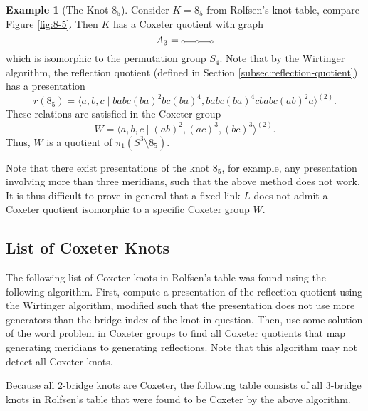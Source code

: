 \documentclass{article}
\theoremstyle{definition}
\newtheorem{example}[theorem]{Example}
\newcommand{\coxtwothreethree}{%
\begin{tikzpicture}[scale=0.5]
\draw (0, 0) circle (0.1);
\draw (1, 0) circle (0.1);
\draw (2, 0) circle (0.1);
\draw (0.1, 0) -- (0.9, 0);
\draw (1.1, 0) -- (1.9, 0);
\end{tikzpicture}}
\begin{document}
\begin{example}[The Knot $8_5$]
Consider $K = 8_5$ from Rolfsen's knot table, compare Figure \ref{fig:8-5}. Then $K$ has a Coxeter quotient with graph $$A_3 =\coxtwothreethree$$ which is isomorphic to the permutation group $S_4$.
Note that by the Wirtinger algorithm, the reflection quotient (defined in Section \ref{subsec:reflection-quotient}) has a presentation
$$r(8_5) = \langle a, b, c\; | \; babc(ba)^2bc(ba)^4, babc(ba)^4cbabc(ab)^2a \rangle^{(2)}.$$
These relations are satisfied in the Coxeter group
$$W = \langle a, b, c \; | \; (ab)^2, (ac)^3, (bc)^3 \rangle^{(2)}.$$
Thus, $W$ is a quotient of $\pi_1(S^3 \setminus 8_5)$.
\end{example}

Note that there exist presentations of the knot $8_5$, for example, any presentation involving more than three meridians, such that the above method does not work. It is thus difficult to prove in general that a fixed link $L$ does not admit a Coxeter quotient isomorphic to a specific Coxeter group $W$.

\subsection{List of Coxeter Knots}
The following list of Coxeter knots in Rolfsen's table \cite{rolfsen2003} was found using the following algorithm. First, compute a presentation of the reflection quotient using the Wirtinger algorithm, modified such that the presentation does not use more generators than the bridge index of the knot in question. Then, use some solution of the word problem in Coxeter groups to find all Coxeter quotients that map generating meridians to generating reflections. Note that this algorithm may not detect all Coxeter knots.

Because all $2$-bridge knots are Coxeter, the following table consists of all $3$-bridge knots in Rolfsen's table that were found to be Coxeter by the above algorithm.
\end{document}

